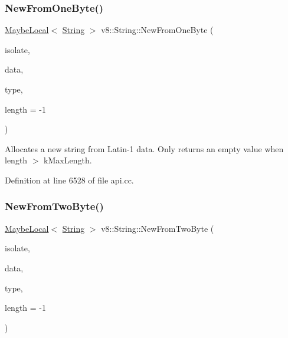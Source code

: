 \subsubsection{\texorpdfstring{New\+From\+One\+Byte()}{NewFromOneByte()}}
{\footnotesize\ttfamily \mbox{\hyperlink{classv8_1_1MaybeLocal}{Maybe\+Local}}$<$ \mbox{\hyperlink{classv8_1_1String}{String}} $>$ v8\+::\+String\+::\+New\+From\+One\+Byte (\begin{DoxyParamCaption}\item[{Isolate $\ast$}]{isolate,  }\item[{const uint8\+\_\+t $\ast$}]{data,  }\item[{\mbox{\hyperlink{namespacev8_ac9163ab12fb3b2a95907a3a0367c6095}{v8\+::\+New\+String\+Type}}}]{type,  }\item[{\mbox{\hyperlink{classint}{int}}}]{length = {\ttfamily -\/1} }\end{DoxyParamCaption})\hspace{0.3cm}{\ttfamily [static]}}

Allocates a new string from Latin-\/1 data. Only returns an empty value when length $>$ k\+Max\+Length. 

Definition at line 6528 of file api.\+cc.

\mbox{\label{classv8_1_1String_a6b3efe5df1016e4f9f485e79b0acdf5b}} 
\subsubsection{\texorpdfstring{New\+From\+Two\+Byte()}{NewFromTwoByte()}}
{\footnotesize\ttfamily \mbox{\hyperlink{classv8_1_1MaybeLocal}{Maybe\+Local}}$<$ \mbox{\hyperlink{classv8_1_1String}{String}} $>$ v8\+::\+String\+::\+New\+From\+Two\+Byte (\begin{DoxyParamCaption}\item[{Isolate $\ast$}]{isolate,  }\item[{const uint16\+\_\+t $\ast$}]{data,  }\item[{\mbox{\hyperlink{namespacev8_ac9163ab12fb3b2a95907a3a0367c6095}{v8\+::\+New\+String\+Type}}}]{type,  }\item[{\mbox{\hyperlink{classint}{int}}}]{length = {\ttfamily -\/1} }\end{DoxyParamCaption})\hspace{0.3cm}{\ttfamily [static]}}

